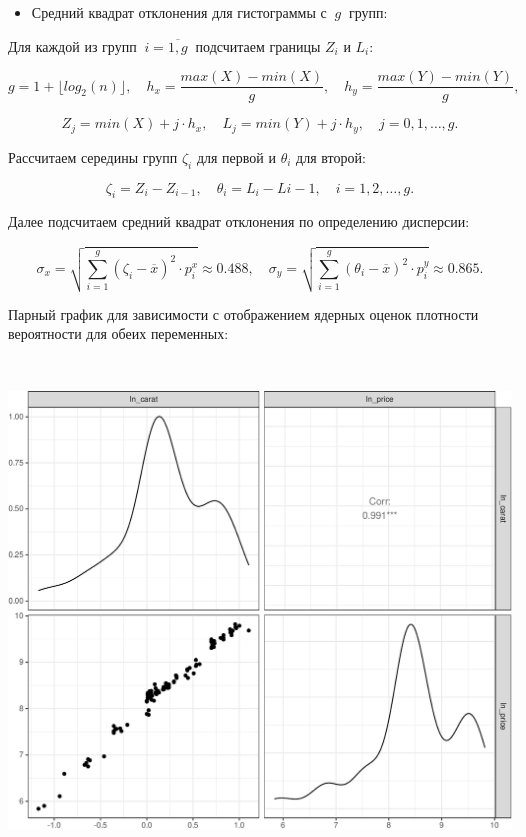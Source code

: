 \documentclass[
]{article}
\providecommand{\tightlist}{%
  \setlength{\itemsep}{0pt}\setlength{\parskip}{0pt}}
\begin{document}
\begin{itemize}
\tightlist
\item
  Средний квадрат отклонения для гистограммы с \(\ g\ \) групп:
\end{itemize}

Для каждой из групп \(\ i = \overline{1, g}\ \) подсчитаем границы
\(Z_i\) и \(L_i\):

\[
g = 1 + \lfloor log_2(n)\rfloor, \quad  h_x = \frac{max(X) - min(X)}{g}, \quad h_y = \frac{max(Y) - min(Y)}{g},
\]

\[
Z_j = min(X) + j \cdot h_x,\quad L_j = min(Y) + j \cdot h_y, \quad  j=0, 1, \dots, g.
\]

Рассчитаем середины групп \(\zeta_i\) для первой и \(\theta_i\) для
второй:

\[
\zeta_i = Z_{i} - Z_{i-1},\quad \theta_i = L_i - L{i-1}, \quad i=1,2,\dots, g.
\]

Далее подсчитаем средний квадрат отклонения по определению дисперсии:

\[
\sigma_x = \sqrt{\sum\limits_{i = 1}^{g} (\zeta_i - \overline{x})^2 \cdot p^x_i} \approx 0.488, \quad 
\sigma_y = \sqrt{\sum\limits_{i = 1}^{g} (\theta_i - \overline{x})^2 \cdot p^y_i} \approx 0.865.
\]

Парный график для зависимости с отображением ядерных оценок плотности
вероятности для обеих переменных:

\(\ \)

\begin{center}\includegraphics[width=0.85\linewidth]{Prac5_files/figure-latex/unnamed-chunk-10-1} \end{center}
\end{document}
